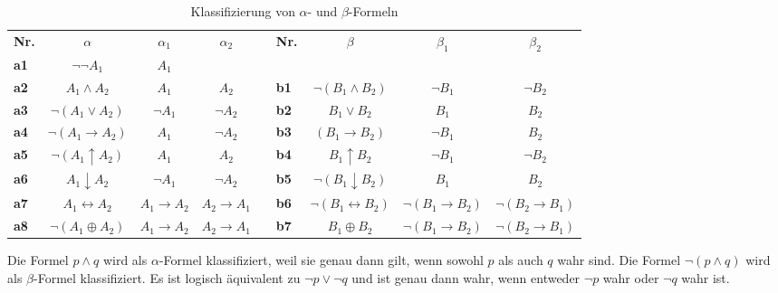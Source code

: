 \begin{table}[h]
\footnotesize
	\begin{center}
			\begin{tabular}{lcccclccc}
			\cline{1-4}
			\cline{6-9}
			\textbf{Nr.}&\textbf{$\alpha$}&\textbf{$\alpha_1$}&\textbf{$\alpha_2$}&   &\textbf{Nr.}&\textbf{$\beta$}&\textbf{$\beta_1$}&\textbf{$\beta_2$}  \\
			\cline{1-4} 
			\cline{6-9}
			
			\textbf{a1}&$\neg \neg A_1$&$A_1$&  &   &&&&\\
			
			\textbf{a2}&$A_1 \wedge A_2$&$A_1$&$A_2$&   &\textbf{b1}&$\neg (B_1 \wedge B_2)$&$\neg B_1$&$\neg B_2$\\
			\textbf{a3}&$\neg (A_1 \vee A_2)$&$\neg A_1$&$\neg A_2$&   &\textbf{b2}&$B_1 \vee B_2 $&$B_1$&$B_2$\\
			
			\textbf{a4}&$\neg (A_1 \rightarrow A_2)$& $A_1$ & $\neg A_2$&   &\textbf{b3}&$(B_1 \rightarrow B_2)$&$\neg B_1$&$B_2$  \\
			
			\textbf{a5}&$\neg(A_1 \uparrow A_2)$& $A_1$&$A_2$&   &\textbf{b4}&$B_1 \uparrow B_2$&$\neg B_1$&$\neg B_2$  \\
			
			\textbf{a6}&$A_1 \downarrow A_2$&$\neg A_1$ & $\neg A_2$&   &\textbf{b5}&$\neg (B_1 \downarrow B_2)$&$B_1$&$B_2$  \\
			
			\textbf{a7}&$A_1 \leftrightarrow A_2$& $A_1 \rightarrow A_2$&$A_2 \rightarrow A_1$&   &\textbf{b6}&$\neg (B_1 \leftrightarrow B_2)$&$\neg (B_1 \rightarrow B_2)$&$\neg (B_2 \rightarrow B_1)$\\
			
			\textbf{a8}&$\neg (A_1 \oplus A_2)$&$A_1 \rightarrow A_2$&$A_2 \rightarrow A_1$&   &\textbf{b7}&$B_1 \oplus B_2$&$\neg (B_1 \rightarrow B_2)$&$\neg (B_2 \rightarrow B_1)$\\
			\cline{1-4} 
			\cline{6-9}			
			\end{tabular}
	\end{center}
	\caption[Klassifizierung von $\alpha$- und $\beta$-Formeln]{Klassifizierung von $\alpha$- und $\beta$-Formeln \cite{Ben-Ari}}
	\label{Abb. 2.8}
\end{table}
		
\vspace{0.5cm}\begin{ex} \label{Beispiel 2.63} \end{ex} Die Formel $p \wedge q$ wird als $\alpha$-Formel klassifiziert, weil sie genau dann gilt, wenn sowohl $p$ als auch $q$ wahr sind. Die Formel $\neg(p\wedge q)$ wird als $\beta$-Formel klassifiziert.
Es ist logisch äquivalent zu $\neg p \vee \neg q$ und ist genau dann wahr, wenn entweder $\neg p$ wahr oder $\neg q$ wahr ist.

